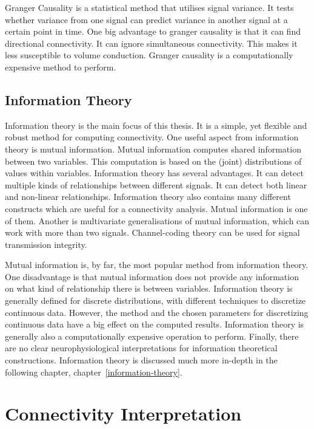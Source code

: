 Granger Causality is a statistical method that utilises signal variance. It tests whether variance from one signal can predict variance in another signal at a certain point in time. One big advantage to granger causality is that it can find directional connectivity. It can ignore simultaneous connectivity. This makes it less susceptible to volume conduction. Granger causality is a computationally expensive method to perform. \cite{bressler2011wiener}

\subsection{Information Theory}

Information theory is the main focus of this thesis. It is a simple, yet flexible and robust method for computing connectivity. One useful aspect from information theory is mutual information. Mutual information computes shared information between two variables. This computation is based on the (joint) distributions of values within variables. Information theory has several advantages. It can detect multiple kinds of relationships between different signals. It can detect both linear and non-linear relationships. Information theory also contains many different constructs which are useful for a connectivity analysis. Mutual information is one of them. Another is multivariate generalisations of mutual information, which can work with more than two signals. Channel-coding theory can be used for signal transmission integrity. 

Mutual information is, by far, the most popular method from information theory. One disadvantage is that mutual information does not provide any information on what kind of relationship there is between variables. Information theory is generally defined for discrete distributions, with different techniques to discretize continuous data. However, the method and the chosen parameters for discretizing continuous data have a big effect on the computed results. Information theory is generally also a computationally expensive operation to perform. Finally, there are no clear neurophysiological interpretations for information theoretical constructions. Information theory is discussed much more in-depth in the following chapter, chapter~\ref{information-theory}.

\section{Connectivity Interpretation}

